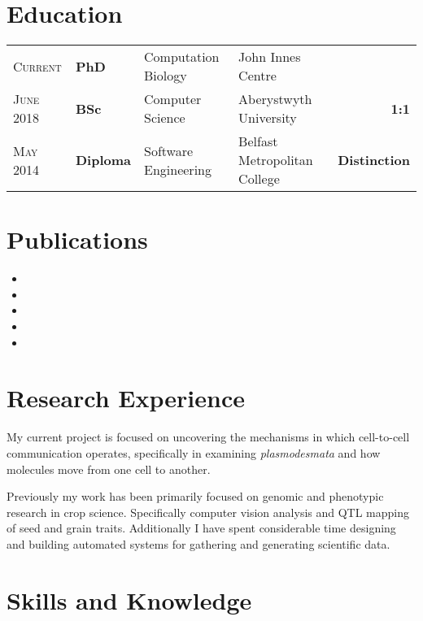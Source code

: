 \documentclass[a4paper,10pt]{article}
\begin{document}
\section{Education}
\begin{tabular}{llllr}

  \textsc{Current}  & \textbf{PhD} & Computation Biology & John Innes Centre &   \\

  \textsc{June} 2018  & \textbf{BSc} & Computer Science & Aberystwyth University & \textbf{1:1} \\

  \textsc{May} 2014& \textbf{Diploma} & Software Engineering & Belfast Metropolitan College &  \textbf{Distinction}

\end{tabular}


\section{Publications}

\begin{itemize}
\item{}
\item{}
\item{}
\item{}
\item{}
\end{itemize}

\clearpage

\section{Research Experience}

My current project is focused on uncovering the mechanisms in which cell-to-cell communication operates, specifically in examining \textit{plasmodesmata} and how molecules move from one cell to another.

Previously my work has been primarily focused on genomic and phenotypic research in crop science. Specifically computer vision analysis and QTL mapping of seed and grain traits. Additionally I have spent considerable time designing and building automated systems for gathering and generating scientific data.


\section{Skills and Knowledge}
\end{document}
